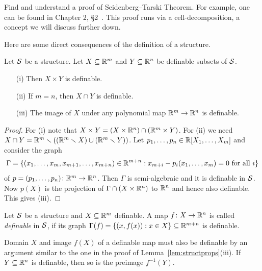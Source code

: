 \begin{exercise}
  Find and understand a proof of Seidenberg--Tarski Theorem. For
  example, one can be found in Chapter 2, \S 2~\cite{D:oMin}. This
  proof runs via a cell-decomposition, a concept we will discuss
  further down. 
\end{exercise}

Here are some direct consequences of the definition of a structure.  

\begin{lemma}
  \label{lem:structprops}
  Let ${\mathcal S}$ be a structure. Let $X\subseteq{\mathbb{R}}^m$ and $Y\subseteq{\mathbb{R}}^n$ be definable subsets of ${\mathcal S}$.
  \begin{enumerate}   
  \item [(i)] Then $X\times Y$ is definable.
  \item[(ii)] If $m=n$, then $X\cap Y$ is definable.
  \item[(iii)] The image of $X$ under any polynomial map
    ${\mathbb{R}}^m\rightarrow {\mathbb{R}}^n$ is definable.
  \end{enumerate}
\end{lemma}
\begin{proof}
  For (i) note that $X\times Y =  (X\times {\mathbb{R}}^n)\cap ({\mathbb{R}}^m\times
  Y)$. For (ii) we need $X\cap Y = {\mathbb{R}}^m\smallsetminus (({\mathbb{R}}^m\smallsetminus X)\cup ({\mathbb{R}}^m
  \smallsetminus Y))$.
  Let $p_1,\ldots,p_n\in{\mathbb{R}}[X_1,\ldots,X_m]$ and consider the graph
  \begin{equation*}
    \Gamma = \{(x_1,\ldots,x_m,x_{m+1},\ldots,x_{m+n})\in{\mathbb{R}}^{m+n} :
    x_{m+i}-p_i(x_1,\ldots,x_m)= 0 \text{ for all }
    i\} 
  \end{equation*}
  of $p=(p_1,\ldots,p_n)\colon {\mathbb{R}}^m\rightarrow{\mathbb{R}}^n$. Then $\Gamma$ is
  semi-algebraic and it is definable in ${\mathcal S}$. Now $p(X)$ is the
  projection of $\Gamma \cap (X\times{\mathbb{R}}^n)$ to ${\mathbb{R}}^n$ and hence also
  definable. This gives (iii). 
\end{proof}

\begin{definition}
  Let ${\mathcal S}$ be a structure and $X\subseteq{\mathbb{R}}^m$ definable.
  A map $f\colon X\rightarrow{\mathbb{R}}^n$ is
  called \emph{definable} in ${\mathcal S}$, if its graph $\Gamma(f) =
  \{(x,f(x)) : x\in X\}\subseteq{\mathbb{R}}^{m+n}$ is definable.
\end{definition}

Domain $X$ and image $f(X)$ of a definable map must also be definable
by an argument similar to the one in the proof of
Lemma~\ref{lem:structprops}(iii). If $Y\subseteq {\mathbb{R}}^n$ is definable,
then so is the preimage $f^{-1}(Y)$. 

